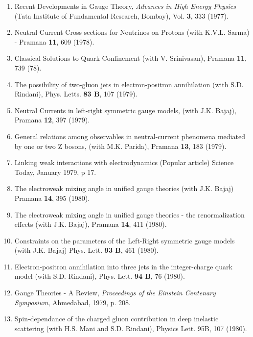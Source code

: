 \begin{enumerate}
\item Recent Developments in Gauge Theory, {\it Advances in High Energy
Physics} (Tata Institute of Fundamental Research, Bo\-mbay), 
Vol. {\bf 3}, 333 (1977).

\item Neutral Current Cross sections for Neutrinos on Protons (with
K.V.L. Sarma) - Pramana {\bf 11}, 609 (1978).

\item Classical Solutions to Quark Confinement (with V. Srinivasan), 
Pramana {\bf 11}, 739 (78).

\item The possibility of two-gluon jets in electron-positron
annihilation (with S.D. Rindani), Phys. Letts. {\bf 83 B}, 107 (1979).

\item Neutral Currents in left-right symmetric gauge models, (wi\-th J.K.
Bajaj), Pramana {\bf 12}, 397 (1979).

\item General relations among observables in neutral-current phenomena
mediated by one or two Z bosons, (with M.K. Parida), Pramana {\bf 13}, 
183 (1979).

\item Linking weak interactions with electrodynamics (Popular article)
Science Today, January 1979, p 17.

\item The electroweak mixing angle in unified gauge theories (with J.K.
Bajaj) Pramana {\bf 14}, 395 (1980).

\item The electroweak mixing angle in unified gauge theories - the
renormalization effects (with J.K. Bajaj), Pramana {\bf 14}, 411
(1980).

\item Constraints on the parameters of the Left-Right symme\-tric gauge
models (with J.K. Bajaj) Phys. Lett. {\bf 93 B}, 461 (1980).
\newpage
\item Electron-positron annihilation into three jets in the
inte\-ger-charge quark model (with S.D. Rindani), Phys. Lett. {\bf 94 B}, 
76 (1980).

\item Gauge Theories - A Review, {\it Proceedings of the Einstein Centenary
Symposium}, Ahmedabad, 1979, p. 208.

\item Spin-dependance of the charged gluon contribution in de\-ep
inelastic scattering (with H.S. Mani and S.D. Rindani), Physics Lett.
95B, 107 (1980).


\end{enumerate}
